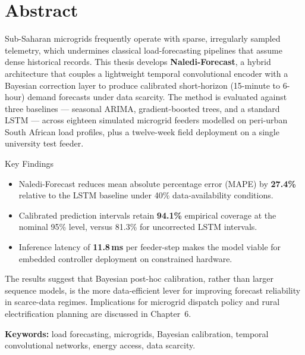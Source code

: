 \chapter*{Abstract}

Sub-Saharan microgrids frequently operate with sparse, irregularly sampled telemetry, which
undermines classical load-forecasting pipelines that assume dense historical records. This
thesis develops \textbf{Naledi-Forecast}, a hybrid architecture that couples a lightweight
temporal convolutional encoder with a Bayesian correction layer to produce calibrated
short-horizon (15-minute to 6-hour) demand forecasts under data scarcity. The method is
evaluated against three baselines --- seasonal ARIMA, gradient-boosted trees, and a standard
LSTM --- across eighteen simulated microgrid feeders modelled on peri-urban South African
load profiles, plus a twelve-week field deployment on a single university test feeder.

\begin{keybox}{Key Findings}
\begin{itemize}
  \item Naledi-Forecast reduces mean absolute percentage error (MAPE) by \textbf{27.4\%}
        relative to the LSTM baseline under 40\% data-availability conditions.
  \item Calibrated prediction intervals retain \textbf{94.1\%} empirical coverage at the
        nominal 95\% level, versus 81.3\% for uncorrected LSTM intervals.
  \item Inference latency of \textbf{11.8\,ms} per feeder-step makes the model viable for
        embedded controller deployment on constrained hardware.
\end{itemize}
\end{keybox}

The results suggest that Bayesian post-hoc calibration, rather than larger sequence models,
is the more data-efficient lever for improving forecast reliability in scarce-data regimes.
Implications for microgrid dispatch policy and rural electrification planning are discussed
in Chapter~6.

\vspace{0.6cm}
\noindent\textbf{Keywords:} load forecasting, microgrids, Bayesian calibration, temporal
convolutional networks, energy access, data scarcity.

